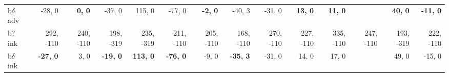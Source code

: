 \begin{table}[p]
{\begin{tabular}{lrrrrrrrrrrrrr}
b$\delta$ adv & -28, 0 & \textbf{0, 0} & -37, 0 & 115, 0 & -77, 0 & \textbf{-2, 0} & -40, 3 & -31, 0 & \textbf{13, 0} & \textbf{11, 0} &  & \textbf{40, 0} & \textbf{-11, 0} \\
b? ink & 292, -110 & 240, -110 & 198, -319 & 235, -319 & 211, -110 & 205, -110 & 168, -110 & 270, -110 & 227, -110 & 335, -110 & 247, -110 & 193, -319 & 222, -110 \\
b$\delta$ ink & \textbf{-27, 0} & 3, 0 & \textbf{-19, 0} & \textbf{113, 0} & \textbf{-76, 0} & -9, 0 & \textbf{-35, 3} & -31, 0 & 14, 0 & 17, 0 &  & 49, 0 & -15, 0 \\

\end{tabular}
}
\end{table}
\clearpage
